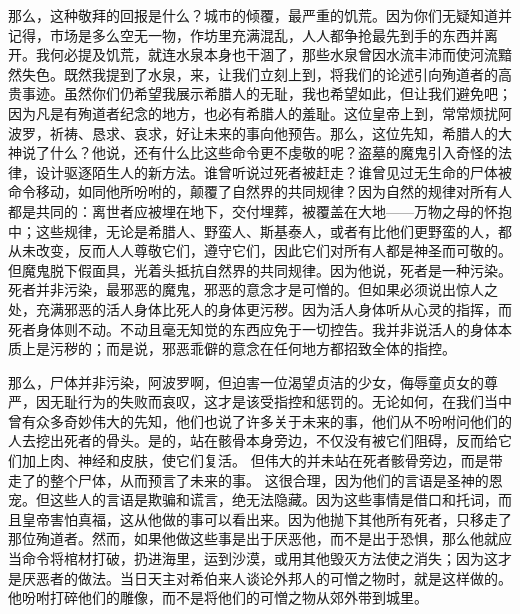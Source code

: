 那么，这种敬拜的回报是什么？城市的倾覆，最严重的饥荒。因为你们无疑知道并记得，市场是多么空无一物，作坊里充满混乱，人人都争抢最先到手的东西并离开。我何必提及饥荒，就连水泉本身也干涸了，那些水泉曾因水流丰沛而使河流黯然失色。既然我提到了水泉，来，让我们立刻上到，将我们的论述引向殉道者的高贵事迹。虽然你们仍希望我展示希腊人的无耻，我也希望如此，但让我们避免吧；因为凡是有殉道者纪念的地方，也必有希腊人的羞耻。这位皇帝上到，常常烦扰阿波罗，祈祷、恳求、哀求，好让未来的事向他预告。那么，这位先知，希腊人的大神说了什么？他说，还有什么比这些命令更不虔敬的呢？盗墓的魔鬼引入奇怪的法律，设计驱逐陌生人的新方法。谁曾听说过死者被赶走？谁曾见过无生命的尸体被命令移动，如同他所吩咐的，颠覆了自然界的共同规律？因为自然的规律对所有人都是共同的：离世者应被埋在地下，交付埋葬，被覆盖在大地——万物之母的怀抱中；这些规律，无论是希腊人、野蛮人、斯基泰人，或者有比他们更野蛮的人，都从未改变，反而人人尊敬它们，遵守它们，因此它们对所有人都是神圣而可敬的。但魔鬼脱下假面具，光着头抵抗自然界的共同规律。因为他说，死者是一种污染。死者并非污染，最邪恶的魔鬼，邪恶的意念才是可憎的。但如果必须说出惊人之处，充满邪恶的活人身体比死人的身体更污秽。因为活人身体听从心灵的指挥，而死者身体则不动。不动且毫无知觉的东西应免于一切控告。我并非说活人的身体本质上是污秽的；而是说，邪恶乖僻的意念在任何地方都招致全体的指控。\par

那么，尸体并非污染，阿波罗啊，但迫害一位渴望贞洁的少女，侮辱童贞女的尊严，因无耻行为的失败而哀叹，这才是该受指控和惩罚的。无论如何，在我们当中曾有众多奇妙伟大的先知，他们也说了许多关于未来的事，他们从不吩咐问他们的人去挖出死者的骨头。是的，站在骸骨本身旁边，不仅没有被它们阻碍，反而给它们加上肉、神经和皮肤，使它们复活。 但伟大的并未站在死者骸骨旁边，而是带走了的整个尸体，从而预言了未来的事。 这很合理，因为他们的言语是圣神的恩宠。但这些人的言语是欺骗和谎言，绝无法隐藏。因为这些事情是借口和托词，而且皇帝害怕真福，这从他做的事可以看出来。因为他抛下其他所有死者，只移走了那位殉道者。然而，如果他做这些事是出于厌恶他，而不是出于恐惧，那么他就应当命令将棺材打破，扔进海里，运到沙漠，或用其他毁灭方法使之消失；因为这才是厌恶者的做法。当日天主对希伯来人谈论外邦人的可憎之物时，就是这样做的。他吩咐打碎他们的雕像，而不是将他们的可憎之物从郊外带到城里。\par

